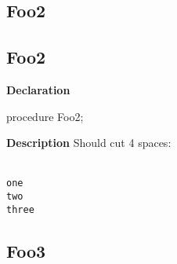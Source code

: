 \documentclass{report}
\newif\ifpdf
\begin{document}
\subsection*{\large{\textbf{Foo2}}\normalsize\hspace{1ex}\hrulefill}
\else
\subsection*{Foo2}
\fi
\label{ok_longcode_indentation-Foo2}
\begin{list}{}{
\setlength{\itemindent}{0cm}
\setlength{\listparindent}{0cm}
\setlength{\leftmargin}{\evensidemargin}
\addtolength{\leftmargin}{\tmplength}
\settowidth{\labelsep}{X}
\addtolength{\leftmargin}{\labelsep}
\setlength{\labelwidth}{\tmplength}
}
\item[\textbf{Declaration}\hfill]
\ifpdf
\begin{flushleft}
\fi
\begin{ttfamily}
procedure Foo2;\end{ttfamily}

\ifpdf
\end{flushleft}
\fi

\par
\item[\textbf{Description}]
Should cut 4 spaces:

\texttt{\\\nopagebreak[3]
one\\\nopagebreak[3]
two\\\nopagebreak[3]
three\\
}

\end{list}
\ifpdf
\subsection*{\large{\textbf{Foo3}}\normalsize\hspace{1ex}\hrulefill}
\else
\end{document}
